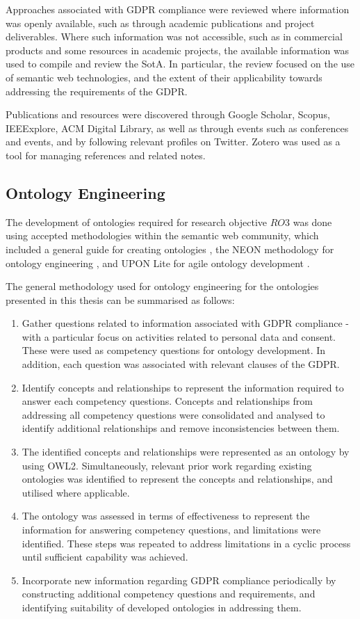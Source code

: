 Approaches associated with GDPR compliance were reviewed where information was openly available, such as through academic publications and project deliverables.
Where such information was not accessible, such as in commercial products and some resources in academic projects, the available information was used to compile and review the SotA.
In particular, the review focused on the use of semantic web technologies, and the extent of their applicability towards addressing the requirements of the GDPR.

Publications and resources were discovered through Google Scholar, Scopus, IEEExplore, ACM Digital Library, as well as through events such as conferences and events, and by following relevant profiles on Twitter.
Zotero was used as a tool for managing references and related notes.

\subsection{Ontology Engineering}\label{sec:intro:ontology-engineering}
The development of ontologies required for research objective $RO3$ was done using accepted methodologies within the semantic web community, which included a general guide for creating ontologies \cite{noy_ontology_2001}, the NEON methodology for ontology engineering \cite{suarez-figueroa_neon_2012}, and UPON Lite for agile ontology development \cite{de_nicola_lightweight_2016}.

The general methodology used for ontology engineering for the ontologies presented in this thesis can be summarised as follows:
\begin{enumerate}
	\item Gather questions related to information associated with GDPR compliance - with a particular focus on activities related to personal data and consent. These were used as competency questions for ontology development. In addition, each question was associated with relevant clauses of the GDPR.
	\item Identify concepts and relationships to represent the information required to answer each competency questions. Concepts and relationships from addressing all competency questions were consolidated and analysed to identify additional relationships and remove inconsistencies between them.
	\item The identified concepts and relationships were represented as an ontology by using OWL2. Simultaneously, relevant prior work regarding existing ontologies was identified to represent the concepts and relationships, and utilised where applicable.
	\item The ontology was assessed in terms of effectiveness to represent the information for answering competency questions, and limitations were identified. These steps was repeated to address limitations in a cyclic process until sufficient capability was achieved.
    \item Incorporate new information regarding GDPR compliance periodically by constructing additional competency questions and requirements, and identifying suitability of developed ontologies in addressing them.
\end{enumerate}

